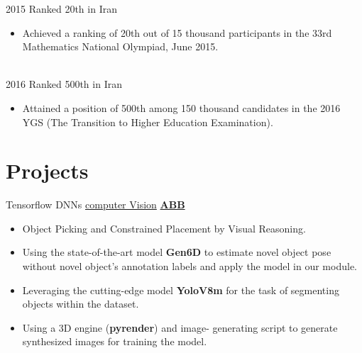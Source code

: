 \documentclass[letterpaper]{DS_class_file} %
\begin{document}
\begin{twenty} %
	\twentyitem
	{2015}
	{}
	{\hspace{0.3cm}Ranked 20th in Iran}
	{}
	{}
	{
		{\begin{itemize}
				\item Achieved a ranking of 20th out of 15 thousand participants in the 33rd Mathematics National Olympiad, June 2015.
		\end{itemize}}
	}
	\\
	\twentyitem
	{2016}
	{}
	{\hspace{0.3cm}Ranked 500th in Iran}
	{}
	{}
	{\begin{itemize}
			\item Attained a position of 500th among 150 thousand candidates in the 2016 YGS (The Transition to Higher Education Examination).    
   
	\end{itemize}}

\end{twenty}



\newpage
\makeseconda
\section{Projects}

\begin{twenty} %
    
	\twentyitem
	{Tensorflow}
	{DNNs}
	{\hspace{0.3cm}\href{}{computer Vision}}
	{\href{https://new.abb.com/se}{\textbf{ABB}}}
	{}
	{
		{\begin{itemize}
				\item Object Picking and Constrained Placement by Visual Reasoning.
                \item Using the state-of-the-art model \textbf{Gen6D} to estimate novel object pose without novel object’s annotation labels and apply the model in our module.
                \item Leveraging the cutting-edge model \textbf{YoloV8m} for the task of segmenting objects within the dataset.
    \item Using a 3D engine (\textbf{pyrender}) and image-
generating script to generate synthesized images for training the model.
		\end{itemize}}
	}
	
\end{twenty}
\end{document}
